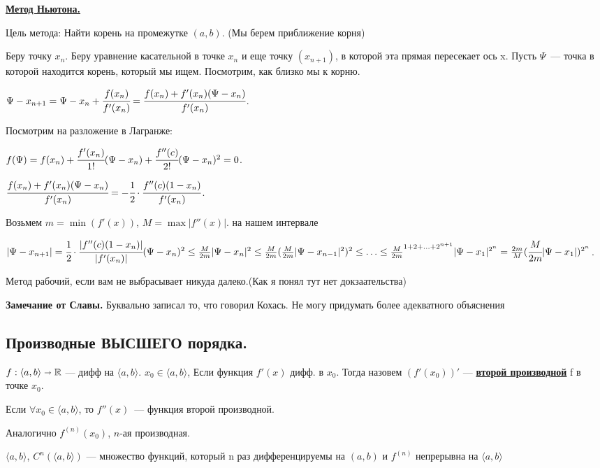 \documentclass{article}
\newcommand{\deff}[1]{\underline{\textbf{#1}}}
\begin{document}

 \deff{Метод Ньютона.}

Цель метода: Найти корень на промежутке $(a,b)$. (Мы берем приближение корня) 


 Беру точку $x_n$. Беру уравнение касательной в точке $x_n$ и еще точку $(x_{n+1})$, в которой эта прямая пересекает ось x. Пусть $\Psi$~--- точка  в которой находится корень, который мы ищем. Посмотрим, как близко мы к корню.

 $\Psi - x_{n+1} = \Psi-x_n + \cfrac{f(x_n)}{f'(x_n)} = \cfrac{f(x_n)  + f'(x_n) (\Psi-x_n)}{f'(x_n)}$.

 Посмотрим на разложение в Лагранже:
 
 $f(\Psi) = f(x_n) + \cfrac{f'(x_n)}{1!}(\Psi-x_n) + \cfrac{f''(c)}{2!}(\Psi-x_n)^2 = 0$.

$ \cfrac{f(x_n)  + f'(x_n) (\Psi-x_n)}{f'(x_n)} = -\cfrac{1}{2}\cdot \cfrac{f''(c)(1-x_n)}{f'(x_n)}$.

Возьмем $m = \min (f'(x))$, $M = \max |f''(x)| $. на нашем интервале

$|\Psi-x_{n+1}| = \cfrac{1}{2}\cdot \cfrac{|f''(c)(1-x_n)|}{|f'(x_n)|}(\Psi -x_n)^2\leq \frac{M}{2m}|\Psi - x_n|^2 \leq \frac{M}{2m}(\frac{M}{2m}|\Psi-{x_{n-1}}|^2)^2\leq \ldots \leq \frac{M}{2m}^{1+2+\ldots+2^{n+1}} |\Psi-x_1|^{2^n}= \frac{2m}{M}(\cfrac{M}{2m}|\Psi-x_1|)^{2^n}$.

Метод рабочий, если вам не выбрасывает никуда далеко.(Как я понял тут нет докзаательства)

\textbf{Замечание от Славы.} Буквально записал то, что говорил Кохась. Не могу придумать более адекватного объяснения

\pagebreak
\subsection{Производные ВЫСШЕГО порядка.}

$f:\langle a,b \rangle \shortrightarrow \mathbb{R}$ --- дифф на $\langle a,b \rangle$. $x_0 \in \langle a,b \rangle$,  Если функция $f'(x)$ дифф. в $x_0$. Тогда назовем $(f'(x_0))'$ --- \deff{второй производной} f в точке $x_0$.

Если $\forall x_0 \in \langle a,b\rangle$, то $f''(x)$~--- функция второй производной.

Аналогично $f^{(n)}(x_0)$, $n$-ая производная.

$\langle a,b\rangle$, $C^n (\langle a,b \rangle)$ --- множество функций, который n раз дифференцируемы на $(a,b)$ и $f^{(n)}$ непрерывна на $\langle a,b \rangle$
\end{document}
